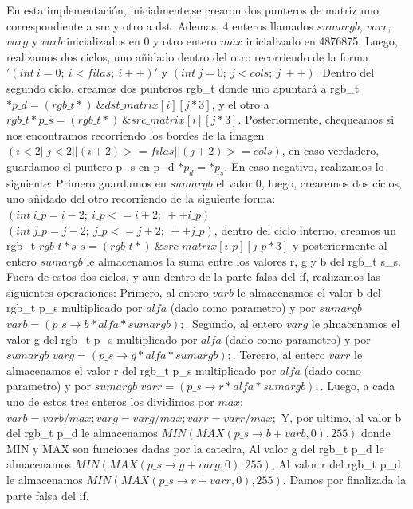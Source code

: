 En esta implementación, inicialmente,se crearon dos punteros de matriz uno correspondiente a src y otro a dst.\newline 
Ademas, 4 enteros llamados $sumargb$, $varr$,$varg$ y $varb$ inicializados en 0 y otro entero $max$ inicializado en 4876875. \newline
Luego, realizamos dos ciclos, uno añidado dentro del otro recorriendo de la forma $'(int\ i = 0;\ i < filas;\ i++)'$ y 
$(int\ j = 0;\ j < cols;\ j\ ++)$.\newline
Dentro del segundo ciclo, creamos dos punteros rgb\_t donde uno apuntará a \newline rgb\_t $*p\_d = (rgb\_t*)\  \&dst\_matrix[i][j*3]$, y el otro
a $rgb\_t *p\_s = (rgb\_t*)\ \&src\_matrix[i][j*3]$.\newline
Posteriormente, chequeamos si nos encontramos recorriendo los bordes de la imagen \newline $(i < 2 || j < 2 || (i + 2) >= filas || (j + 2) >= cols)$,
en caso verdadero, guardamos el puntero p\_s en p\_d $*p_d=*p_s$. \newline
En caso negativo, realizamos lo siguiente:\newline
Primero guardamos en $sumargb$ el valor 0, luego, crearemos dos ciclos, uno añidado del otro recorriendo de la siguiente forma:\newline
$(int\  i\_p = i-2;\  i\_p <= i+2;\  ++i\_p)$ $(int\  j\_p = j-2;\  j\_p <= j+2;\  ++j\_p)$, dentro del ciclo interno,
creamos un rgb\_t $rgb\_t *s\_s = (rgb\_t*)\  \&src\_matrix[i\_p][j\_p*3]$ y posteriormente al entero $sumargb$ le almacenamos la
suma entre los valores r, g y b del rgb\_t s\_s.\newline
Fuera de estos dos ciclos, y aun dentro de la parte falsa del if, realizamos las siguientes operaciones:\newline
Primero, al entero $varb$ le almacenamos el valor b del rgb\_t p\_s multiplicado por $alfa$ (dado como parametro) y por $sumargb$ $varb = (p\_s\rightarrow b * alfa * sumargb);$.\newline
Segundo, al entero $varg$ le almacenamos el valor g del rgb\_t p\_s multiplicado por $alfa$ (dado como parametro) y por $sumargb$ $varg = (p\_s\rightarrow g * alfa * sumargb);$.\newline
Tercero, al entero $varr$ le almacenamos el valor r del rgb\_t p\_s multiplicado por $alfa$ (dado como parametro) y por $sumargb$ $varr = (p\_s\rightarrow r * alfa * sumargb);$.\newline
Luego, a cada uno de estos tres enteros los dividimos por $max$: \newline
$varb = varb/max;
varg = varg/max;
varr = varr/max;$\newline
Y, por ultimo, al valor b del rgb\_t p\_d le almacenamos $MIN(MAX(p\_s\rightarrow b + varb, 0),255)$ donde MIN y MAX son funciones dadas por la catedra, \newline
Al valor g del rgb\_t p\_d le almacenamos $MIN(MAX(p\_s\rightarrow g + varg, 0),255)$,\newline
Al valor r del rgb\_t p\_d le almacenamos $MIN(MAX(p\_s\rightarrow r + varr, 0),255)$.\newline
Damos por finalizada la parte falsa del if.\newline

